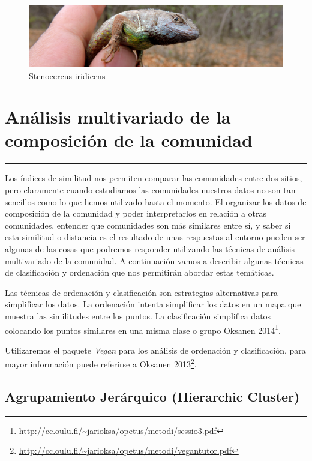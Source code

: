 \documentclass[]{book}
\let\rmarkdownfootnote\footnote%
\def\footnote{\protect\rmarkdownfootnote}
\begin{document}
\begin{figure}[htbp]
\centering
\includegraphics{lagar.jpg}
\caption{Stenocercus iridicens}
\end{figure}

\chapter{Análisis multivariado de la composición de la
comunidad}\label{analisis-multivariado-de-la-composicion-de-la-comunidad}

\begin{center}\rule{0.5\linewidth}{\linethickness}\end{center}

Los índices de similitud nos permiten comparar las comunidades entre dos
sitios, pero claramente cuando estudiamos las comunidades nuestros datos
no son tan sencillos como lo que hemos utilizado hasta el momento. El
organizar los datos de composición de la comunidad y poder
interpretarlos en relación a otras comunidades, entender que comunidades
son más similares entre sí, y saber si esta similitud o distancia es el
resultado de unas respuestas al entorno pueden ser algunas de las cosas
que podremos responder utilizando las técnicas de análisis multivariado
de la comunidad. A continuación vamos a describir algunas técnicas de
clasificación y ordenación que nos permitirán abordar estas temáticas.

Las técnicas de ordenación y clasificación son estrategias alternativas
para simplificar los datos. La ordenación intenta simplificar los datos
en un mapa que muestra las similitudes entre los puntos. La
clasificación simplifica datos colocando los puntos similares en una
misma clase o grupo Oksanen 2014\footnote{\url{http://cc.oulu.fi/~jarioksa/opetus/metodi/sessio3.pdf}}.

Utilizaremos el paquete \emph{Vegan} para los análisis de ordenación y
clasificación, para mayor información puede referirse a Oksanen
2013\footnote{\url{http://cc.oulu.fi/~jarioksa/opetus/metodi/vegantutor.pdf}}.

\section{Agrupamiento Jerárquico (Hierarchic
Cluster)}\label{agrupamiento-jerarquico-hierarchic-cluster}
\end{document}
